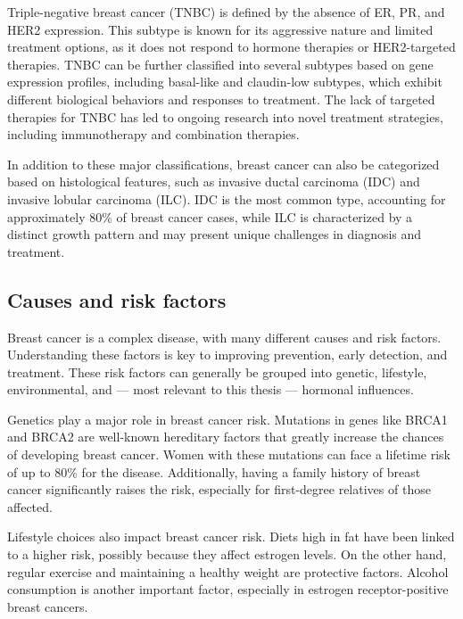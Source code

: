 Triple-negative breast cancer (TNBC) is defined by the absence of ER, PR, and
HER2 expression. This subtype is known for its aggressive nature and limited
treatment options, as it does not respond to hormone therapies or HER2-targeted
therapies\supercite{sizemore_triple_2021}. TNBC can be further classified into
several subtypes based on gene expression profiles, including basal-like and
claudin-low subtypes, which exhibit different biological behaviors and responses
to treatment\supercite{lehmann_identification_2011}. The lack of targeted
therapies for TNBC has led to ongoing research into novel treatment strategies,
including immunotherapy and combination
therapies\supercite{lehmann_identification_2011}.

In addition to these major classifications, breast cancer can also be
categorized based on histological features, such as invasive ductal carcinoma
(IDC) and invasive lobular carcinoma (ILC). IDC is the most common type,
accounting for approximately 80\% of breast cancer cases, while ILC is
characterized by a distinct growth pattern and may present unique challenges in
diagnosis and treatment\supercite{mittal_molecular_nodate}.

\subsection{Causes and risk factors}

Breast cancer is a complex disease, with many different causes and risk factors.
Understanding these factors is key to improving prevention, early detection, and
treatment. These risk factors can generally be grouped into genetic, lifestyle,
environmental, and — most relevant to this thesis — hormonal influences.

Genetics play a major role in breast cancer risk. Mutations in genes like BRCA1
and BRCA2 are well-known hereditary factors that greatly increase the chances of
developing breast cancer. Women with these mutations can face a lifetime risk of
up to 80\% for the disease\supercite{jian_clinical_2017}. Additionally, having a
family history of breast cancer significantly raises the risk, especially for
first-degree relatives of those affected\supercite{schairer_risk_2013}.

Lifestyle choices also impact breast cancer risk. Diets high in fat have been
linked to a higher risk, possibly because they affect estrogen
levels\supercite{turner_meta-analysis_2011}. On the other hand, regular exercise
and maintaining a healthy weight are protective
factors\supercite{claudia_admoun_etiology_2022}. Alcohol consumption is another
important factor, especially in estrogen receptor-positive breast
cancers\supercite{bao_association_2011}.


